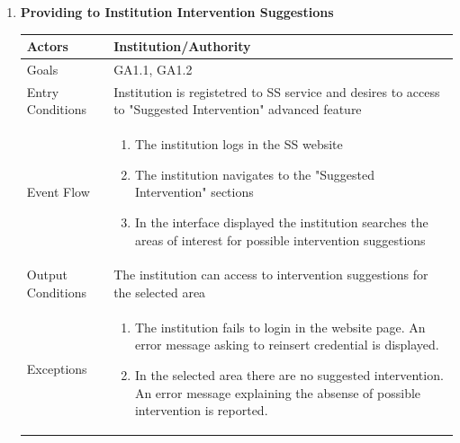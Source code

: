 \begin{enumerate}
	\item \textbf{Providing to Institution Intervention Suggestions}
		\begin{table}[h!]
		\centering
		\begin{tabular}{|l|p{}|}
		\hline
		Actors            			&       	Institution/Authority\\ \hline
		Goals             			&         	GA1.1, GA1.2\\ \hline
		Entry Conditions  	&  		Institution is registetred to SS service and desires to access to "Suggested Intervention" advanced feature\\ \hline
		Event Flow        		&          
				\begin{enumerate}[label=\alph*)]
					\item The institution logs in the SS website
					\item The institution navigates to the "Suggested Intervention" sections
					\item In the interface displayed the institution searches the areas of interest for possible intervention suggestions
					\end{enumerate}\\ \hline
		Output Conditions &    		The institution can access to intervention suggestions for the selected area\\ \hline
		Exceptions        		&       	
				\begin{enumerate}[label=\alph*)]
					\item The institution fails to login in the website page. An error message asking to reinsert credential is displayed.
					\item In the selected area there are no suggested intervention. An error message explaining the absense of possible intervention is reported.
				\end{enumerate}\\ \hline
	\end{tabular}
	\end{table}
	

\end{enumerate}
